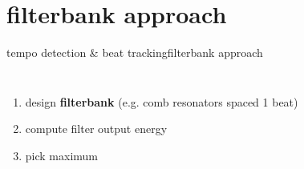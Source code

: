     \section{filterbank approach}
        \begin{frame}{tempo detection \& beat tracking}{filterbank approach}
            \begin{columns}[T]
                \begin{enumerate}
                    \item	design \textbf{filterbank} (e.g. comb resonators spaced 1 beat)
                    \item<2->	compute filter output energy	
                    \item<3->	pick maximum
                \end{enumerate}
\end{columns}
\end{frame}
